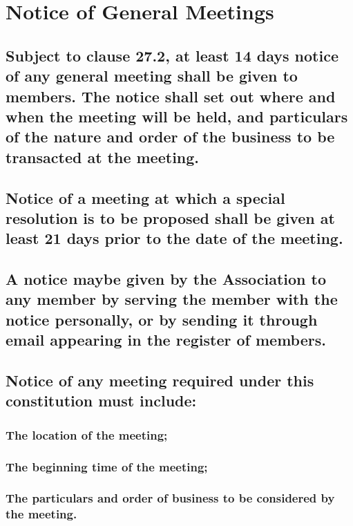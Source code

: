 \documentclass{article}
\newenvironment{subs}
  {\adjustwidth{2em}{0pt}}
  {\endadjustwidth}
\begin{document}
\section{Notice of General Meetings}
\begin{subs}
\subsection{Subject to clause 27.2, at least 14 days notice of any general meeting shall be given to members. The notice shall set out where and when the meeting will be held, and particulars of the nature and order of the business to be transacted at the meeting.}
\subsection{Notice of a meeting at which a special resolution is to be proposed shall be given at least 21 days prior to the date of the meeting.}
\subsection{A notice maybe given by the Association to any member by serving the member with the notice personally, or by sending it through email appearing in the register of members.}

\subsection{Notice of any meeting required under this constitution must include:}
\begin{subs}
\subsubsection{The location of the meeting;}

\subsubsection{The beginning time of the meeting;}
\subsubsection{The particulars and order of business to be considered by the meeting.}
\end{subs}
\end{subs}
\end{document}
